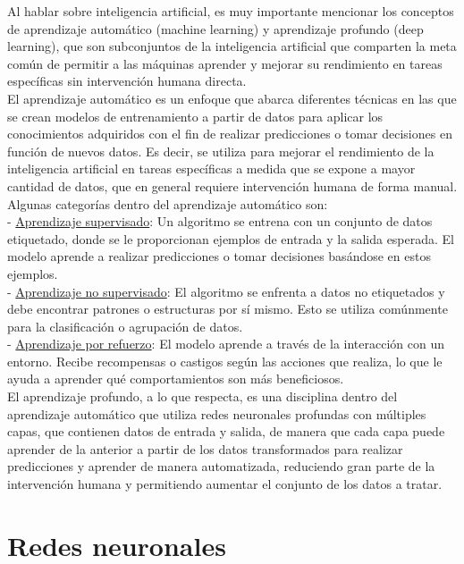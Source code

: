 Al hablar sobre inteligencia artificial, es muy importante mencionar los conceptos de aprendizaje automático (machine learning) y aprendizaje profundo (deep learning), que son subconjuntos de la inteligencia artificial que comparten la meta común de permitir a las máquinas aprender y mejorar su rendimiento en tareas específicas sin intervención humana directa.\\
El aprendizaje automático es un enfoque que abarca diferentes técnicas en las que se crean modelos de entrenamiento a partir de datos para aplicar los conocimientos adquiridos con el fin de realizar predicciones o tomar decisiones en función de nuevos datos. Es decir, se utiliza para mejorar el rendimiento de la inteligencia artificial en tareas específicas a medida que se expone a mayor cantidad de datos, que en general requiere intervención humana de forma manual.\\

Algunas categorías dentro del aprendizaje automático son:\\
- \underline{ Aprendizaje supervisado}: Un algoritmo se entrena con un conjunto de datos etiquetado, donde se le proporcionan ejemplos de entrada y la salida esperada. El modelo aprende a realizar predicciones o tomar decisiones basándose en estos ejemplos.\\

- \underline{ Aprendizaje no supervisado}: El algoritmo se enfrenta a datos no etiquetados y debe encontrar patrones o estructuras por sí mismo. Esto se utiliza comúnmente para la clasificación o agrupación de datos.\\

- \underline{ Aprendizaje por refuerzo}: El modelo aprende a través de la interacción con un entorno. Recibe recompensas o castigos según las acciones que realiza, lo que le ayuda a aprender qué comportamientos son más beneficiosos.\\

El aprendizaje profundo, a lo que respecta, es una disciplina dentro del aprendizaje automático que utiliza redes neuronales profundas con múltiples capas, que contienen datos de entrada y salida, de manera que cada capa puede aprender de la anterior a partir de los datos transformados para realizar predicciones y aprender de manera automatizada, reduciendo gran parte de la intervención humana y permitiendo aumentar el conjunto de los datos a tratar.\\

\section{Redes neuronales}

